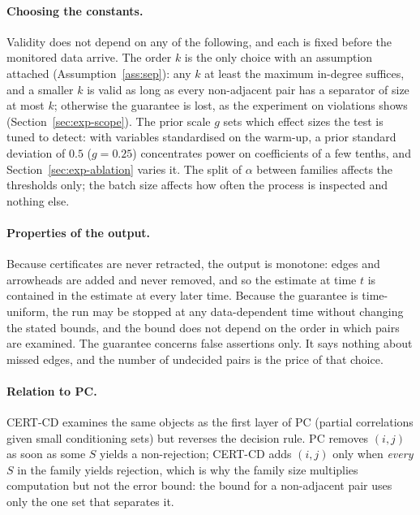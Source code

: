 \paragraph{Choosing the constants.} Validity does not depend on any of the
following, and each is fixed before the monitored data arrive. The order $k$ is
the only choice with an assumption attached (Assumption~\ref{ass:sep}): any
$k$ at least the maximum in-degree suffices, and a smaller $k$ is valid as long
as every non-adjacent pair has a separator of size at most $k$; otherwise the
guarantee is lost, as the experiment on violations shows
(Section~\ref{sec:exp-scope}). The prior scale $g$ sets which effect sizes the
test is tuned to detect: with variables standardised on the warm-up, a prior
standard deviation of $0.5$ ($g=0.25$) concentrates power on coefficients of a
few tenths, and Section~\ref{sec:exp-ablation} varies it. The split of $\alpha$
between families affects the thresholds only; the batch size affects how often
the process is inspected and nothing else.

\paragraph{Properties of the output.} Because certificates are never retracted,
the output is monotone: edges and arrowheads are added and never removed, and
so the estimate at time $t$ is contained in the estimate at every later time.
Because the guarantee is time-uniform, the run may be stopped at any
data-dependent time without changing the stated bounds, and the bound does not
depend on the order in which pairs are examined. The guarantee concerns false
assertions only. It says nothing about missed edges, and the number of
undecided pairs is the price of that choice.

\paragraph{Relation to PC.} CERT-CD examines the same objects as the first
layer of PC (partial correlations given small conditioning sets) but reverses
the decision rule. PC removes $(i,j)$ as soon as some $S$ yields a
non-rejection; CERT-CD adds $(i,j)$ only when \emph{every} $S$ in the family
yields rejection, which is why the family size multiplies computation but not
the error bound: the bound for a non-adjacent pair uses only the one set that
separates it.

